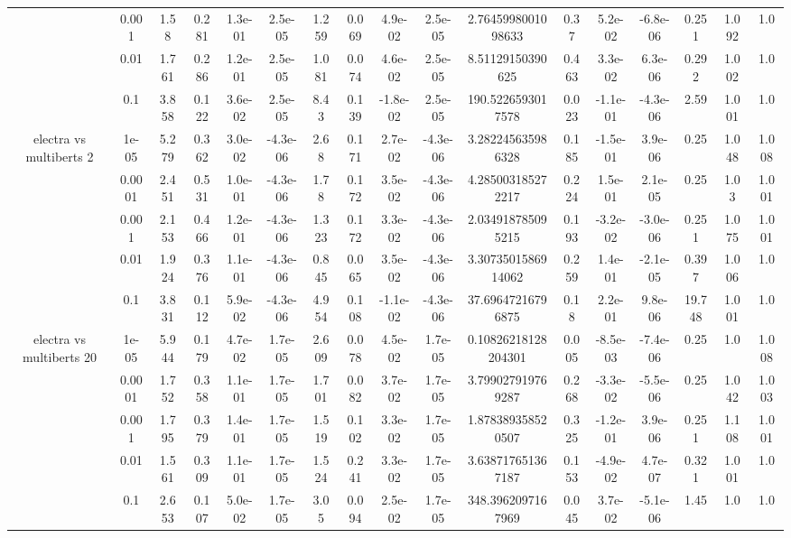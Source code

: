 \begin{tabular}{|c|c|c|c|c|c|c|c|c|c|c|c|c|c|c|c|c|}
 & 0.001 & 1.58 & 0.281 & 1.3e-01 & 2.5e-05 & 1.259 & 0.069 & 4.9e-02 & 2.5e-05 & 2.7645998001098633 & 0.37 & 5.2e-02 & -6.8e-06 & 0.251 & 1.092 & 1.0 \\
 & 0.01 & 1.761 & 0.286 & 1.2e-01 & 2.5e-05 & 1.081 & 0.074 & 4.6e-02 & 2.5e-05 & 8.51129150390625 & 0.463 & 3.3e-02 & 6.3e-06 & 0.292 & 1.002 & 1.0 \\
 & 0.1 & 3.858 & 0.122 & 3.6e-02 & 2.5e-05 & 8.43 & 0.139 & -1.8e-02 & 2.5e-05 & 190.5226593017578 & 0.023 & -1.1e-01 & -4.3e-06 & 2.59 & 1.001 & 1.0 \\
\hline
\multirow{5}{*}{electra  vs multiberts 2} & 1e-05 & 5.279 & 0.362 & 3.0e-02 & -4.3e-06 & 2.68 & 0.171 & 2.7e-02 & -4.3e-06 & 3.282245635986328 & 0.185 & -1.5e-01 & 3.9e-06 & 0.25 & 1.048 & 1.008 \\
 & 0.0001 & 2.451 & 0.531 & 1.0e-01 & -4.3e-06 & 1.78 & 0.172 & 3.5e-02 & -4.3e-06 & 4.285003185272217 & 0.224 & 1.5e-01 & 2.1e-05 & 0.25 & 1.03 & 1.001 \\
 & 0.001 & 2.153 & 0.466 & 1.2e-01 & -4.3e-06 & 1.323 & 0.172 & 3.3e-02 & -4.3e-06 & 2.034918785095215 & 0.193 & -3.2e-02 & -3.0e-06 & 0.251 & 1.075 & 1.001 \\
 & 0.01 & 1.924 & 0.376 & 1.1e-01 & -4.3e-06 & 0.845 & 0.065 & 3.5e-02 & -4.3e-06 & 3.3073501586914062 & 0.259 & 1.4e-01 & -2.1e-05 & 0.397 & 1.006 & 1.0 \\
 & 0.1 & 3.831 & 0.112 & 5.9e-02 & -4.3e-06 & 4.954 & 0.108 & -1.1e-02 & -4.3e-06 & 37.69647216796875 & 0.18 & 2.2e-01 & 9.8e-06 & 19.748 & 1.001 & 1.0 \\
\hline
\multirow{5}{*}{electra  vs multiberts 20} & 1e-05 & 5.944 & 0.179 & 4.7e-02 & 1.7e-05 & 2.609 & 0.078 & 4.5e-02 & 1.7e-05 & 0.10826218128204301 & 0.005 & -8.5e-03 & -7.4e-06 & 0.25 & 1.0 & 1.008 \\
 & 0.0001 & 1.752 & 0.358 & 1.1e-01 & 1.7e-05 & 1.701 & 0.082 & 3.7e-02 & 1.7e-05 & 3.799027919769287 & 0.268 & -3.3e-02 & -5.5e-06 & 0.25 & 1.042 & 1.003 \\
 & 0.001 & 1.795 & 0.379 & 1.4e-01 & 1.7e-05 & 1.519 & 0.102 & 3.3e-02 & 1.7e-05 & 1.878389358520507 & 0.325 & -1.2e-01 & 3.9e-06 & 0.251 & 1.108 & 1.001 \\
 & 0.01 & 1.561 & 0.309 & 1.1e-01 & 1.7e-05 & 1.524 & 0.241 & 3.3e-02 & 1.7e-05 & 3.638717651367187 & 0.153 & -4.9e-02 & 4.7e-07 & 0.321 & 1.001 & 1.0 \\
 & 0.1 & 2.653 & 0.107 & 5.0e-02 & 1.7e-05 & 3.05 & 0.094 & 2.5e-02 & 1.7e-05 & 348.3962097167969 & 0.045 & 3.7e-02 & -5.1e-06 & 1.45 & 1.0 & 1.0 \\

\end{tabular}
